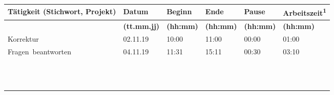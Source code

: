 \documentclass[]{scrartcl}
\begin{document}
	\large
	\begin{center}
		\begin{tabular}{| P{6.7cm} | P{2cm} | P{1.8cm} | P{1.8cm} | P{1.8cm} | P{2.4cm} |}
			\hline
			\textbf{T\"atigkeit (Stichwort, Projekt)}
			& \textbf{Datum}
			& \textbf{Beginn}
			& \textbf{Ende}
			& \textbf{Pause}
			& \textbf{Arbeitszeit\textsuperscript{1}}\\
			\hline
			& \textbf{(tt.mm.jj)}
			& \textbf{(hh:mm)}
			& \textbf{(hh:mm)}
			& \textbf{(hh:mm)}
			& \textbf{(hh:mm)}\\
			\hline
			\mbox{Korrektur}
			& \mbox{02.11.19}
			& \mbox{10:00}
			& \mbox{11:00}
			& \mbox{00:00}
			& \mbox{01:00}\\
			\hline
			\mbox{Fragen beantworten}
			& \mbox{04.11.19}
			& \mbox{11:31}
			& \mbox{15:11}
			& \mbox{00:30}
			& \mbox{03:10}\\
			\hline
			\mbox{}
			& \mbox{}
			& \mbox{}
			& \mbox{}
			& \mbox{}
			& \mbox{}\\
			\hline
			\mbox{}
			& \mbox{}
			& \mbox{}
			& \mbox{}
			& \mbox{}
			& \mbox{}\\
			\hline
			\mbox{}
			& \mbox{}
			& \mbox{}
			& \mbox{}
			& \mbox{}
			& \mbox{}\\
			\hline
			\mbox{}
			& \mbox{}
			& \mbox{}
			& \mbox{}
			& \mbox{}
			& \mbox{}\\
			\hline
			\mbox{}
			& \mbox{}
			& \mbox{}
			& \mbox{}
			& \mbox{}
			& \mbox{}\\
			\hline
			\mbox{}
			& \mbox{}
			& \mbox{}
			& \mbox{}
			& \mbox{}
			& \mbox{}\\
			\hline
			\mbox{}
			& \mbox{}
			& \mbox{}
			& \mbox{}
			& \mbox{}
			& \mbox{}\\
			\hline
			\mbox{}
			& \mbox{}
			& \mbox{}
			& \mbox{}
			& \mbox{}
			& \mbox{}\\
			\hline
			\mbox{}
			& \mbox{}
			& \mbox{}
			& \mbox{}
			& \mbox{}
			& \mbox{}\\
			\hline
			\mbox{}
			& \mbox{}
			& \mbox{}
			& \mbox{}
			& \mbox{}
			& \mbox{}\\
			\hline
			\mbox{}
			& \mbox{}
			& \mbox{}
			& \mbox{}
			& \mbox{}
			& \mbox{}\\
			\hline
			\mbox{}
			& \mbox{}
			& \mbox{}
			& \mbox{}
			& \mbox{}
			& \mbox{}\\

\end{tabular}
\end{center}
\end{document}
